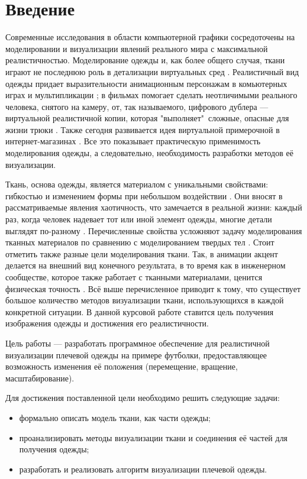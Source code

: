 \chapter*{Введение}

Современные исследования в области компьютерной графики сосредоточены на
моделировании и визуализации явлений реального мира с максимальной
реалистичностью. Моделирование одежды и, как более общего случая, ткани играют
не последнюю роль в детализации виртуальных сред \cite{bib01}.
Реалистичный вид одежды придает выразительности анимационным персонажам в
комьютерных играх и мультипликации \cite{bib02}; в фильмах
помогает сделать неотличимыми реального человека, снятого на камеру, от, так
называемого, цифрового дублера --- виртуальной реалистичной копии, которая
"выполняет"\ сложные,  опасные для жизни трюки \cite{bib03}. Также
сегодня развивается идея виртуальной примерочной в интернет-магазинах
\cite{bib04}. Все это показывает практическую применимость
моделирования одежды, а следовательно, необходимость разработки методов её
визуализации.

Ткань, основа одежды, является материалом с уникальными свойствами: гибкостью и
изменением формы при небольшом воздействии \cite{bib05}. Они вносят в
рассматриваемые явления хаотичность, что  замечается в реальной жизни: каждый
раз, когда человек надевает тот или иной элемент одежды, многие детали выглядят
по-разному \cite{bib06}.  Перечисленные свойства усложняют задачу моделирования
тканных материалов по сравнению с моделированием твердых тел \cite{bib07}.
Стоит отметить также разные цели моделирования ткани. Так, в анимации акцент
делается на внешний вид конечного результата, в то время как в инженерном
сообществе, которое также работает с тканными материалами, ценится физическая
точность \cite{bib03}. Всё выше перечисленное приводит к тому, что существует
большое количество методов визуализации ткани, использующихся в каждой
конкретной ситуации. В данной курсовой работе ставится цель получения
изображения одежды и достижения его реалистичности.

Цель работы --- разработать программное обеспечение для реалистичной
визуализации плечевой одежды на примере футболки, предоставляющее возможность
изменения её положения (перемещение, вращение, масштабирование).

Для достижения поставленной цели необходимо решить следующие задачи:
\begin{itemize}[left=\parindent]
    \item  формально описать модель ткани, как части одежды;
    \item  проанализировать методы визуализации ткани и соединения её частей
           для получения одежды;
    \item  разработать и реализовать алгоритм визуализации плечевой одежды.
\end{itemize}

